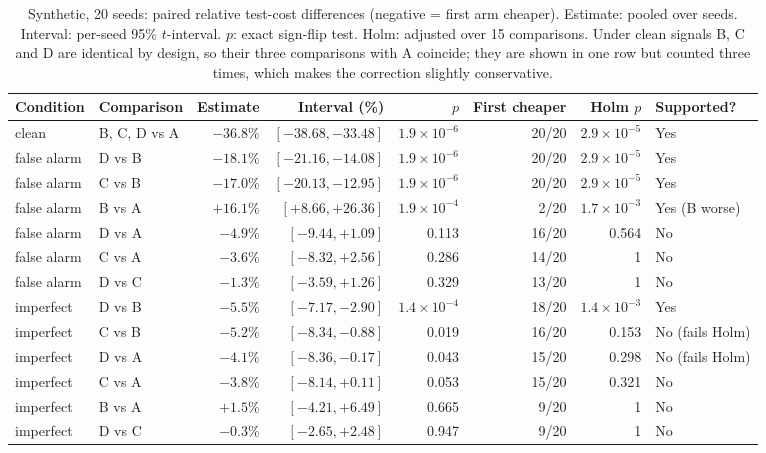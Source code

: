 \begin{table}[t]
\centering
\caption{Synthetic, 20 seeds: paired relative test-cost differences (negative = first arm cheaper). Estimate: pooled over seeds. Interval: per-seed 95\% $t$-interval. $p$: exact sign-flip test. Holm: adjusted over 15 comparisons. Under clean signals B, C and D are identical by design, so their three comparisons with A coincide; they are shown in one row but counted three times, which makes the correction slightly conservative.}
\label{tab:stats20}
\setlength{\tabcolsep}{5pt}
\footnotesize
\begin{tabular}{@{}llrrrrrl@{}}
\toprule
\textbf{Condition} & \textbf{Comparison} & \textbf{Estimate} & \textbf{Interval (\%)} & \textbf{$p$} & \textbf{First cheaper} & \textbf{Holm $p$} & \textbf{Supported?} \\
\midrule
clean       & B, C, D vs A & $-36.8\%$ & $[-38.68, -33.48]$ & $1.9\times10^{-6}$ & 20/20 & $2.9\times10^{-5}$ & Yes \\
false alarm & D vs B & $-18.1\%$ & $[-21.16, -14.08]$ & $1.9\times10^{-6}$ & 20/20 & $2.9\times10^{-5}$ & Yes \\
false alarm & C vs B & $-17.0\%$ & $[-20.13, -12.95]$ & $1.9\times10^{-6}$ & 20/20 & $2.9\times10^{-5}$ & Yes \\
false alarm & B vs A & $+16.1\%$ & $[+8.66, +26.36]$  & $1.9\times10^{-4}$ & 2/20  & $1.7\times10^{-3}$ & Yes (B worse) \\
false alarm & D vs A & $-4.9\%$  & $[-9.44, +1.09]$   & 0.113 & 16/20 & 0.564 & No \\
false alarm & C vs A & $-3.6\%$  & $[-8.32, +2.56]$   & 0.286 & 14/20 & 1     & No \\
false alarm & D vs C & $-1.3\%$  & $[-3.59, +1.26]$   & 0.329 & 13/20 & 1     & No \\
imperfect   & D vs B & $-5.5\%$  & $[-7.17, -2.90]$   & $1.4\times10^{-4}$ & 18/20 & $1.4\times10^{-3}$ & Yes \\
imperfect   & C vs B & $-5.2\%$  & $[-8.34, -0.88]$   & 0.019 & 16/20 & 0.153 & No (fails Holm) \\
imperfect   & D vs A & $-4.1\%$  & $[-8.36, -0.17]$   & 0.043 & 15/20 & 0.298 & No (fails Holm) \\
imperfect   & C vs A & $-3.8\%$  & $[-8.14, +0.11]$   & 0.053 & 15/20 & 0.321 & No \\
imperfect   & B vs A & $+1.5\%$  & $[-4.21, +6.49]$   & 0.665 & 9/20  & 1     & No \\
imperfect   & D vs C & $-0.3\%$  & $[-2.65, +2.48]$   & 0.947 & 9/20  & 1     & No \\
\bottomrule
\end{tabular}
\end{table}

